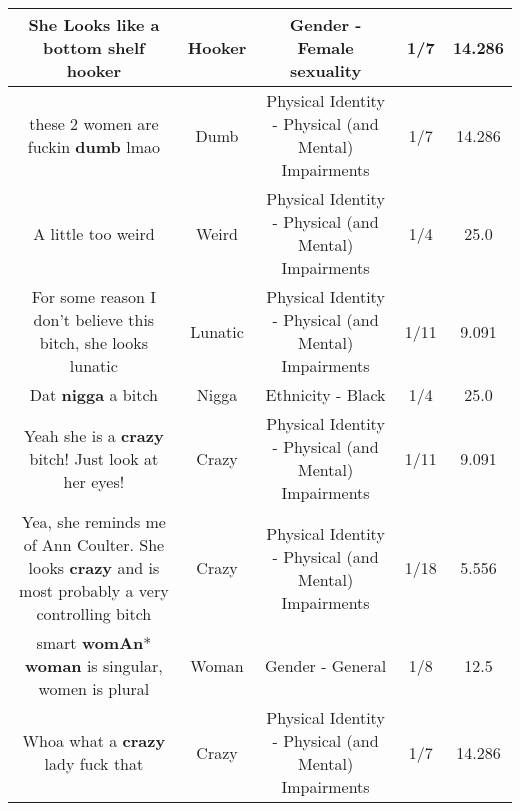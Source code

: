 \documentclass[11pt]{article}
\newlength\mylength
\begin{document}
\begin{center}
\begin{longtable}{|C{.65\mylength}|C{.30\mylength}|C{.12\mylength}|C{.12\mylength}|C{.12\mylength}|}
  \small She Looks like a bottom shelf hooker\normalsize   & Hooker & Gender - Female sexuality & 1/7 & 14.286 \\  \hline
  \small these 2 women are fuckin \textbf{dumb} lmao\normalsize   & Dumb & Physical Identity - Physical (and Mental) Impairments & 1/7 & 14.286 \\  \hline
  \small A little too weird\normalsize   & Weird & Physical Identity - Physical (and Mental) Impairments & 1/4 & 25.0 \\  \hline
  \small For some reason I don't believe this bitch, she looks lunatic\normalsize   & Lunatic & Physical Identity - Physical (and Mental) Impairments & 1/11 & 9.091 \\  \hline
  \small Dat \textbf{nigga} a bitch\normalsize   & Nigga & Ethnicity - Black & 1/4 & 25.0 \\  \hline
  \small Yeah she is a \textbf{crazy} bitch! Just look at her eyes!\normalsize   & Crazy & Physical Identity - Physical (and Mental) Impairments & 1/11 & 9.091 \\  \hline
  \small Yea, she reminds me of Ann Coulter. She looks \textbf{crazy} and is most probably a very controlling bitch\normalsize   & Crazy & Physical Identity - Physical (and Mental) Impairments & 1/18 & 5.556 \\  \hline
  \small smart \textbf{womAn}*   \textbf{woman} is singular, women is plural\normalsize   & Woman & Gender - General & 1/8 & 12.5 \\  \hline
  \small Whoa what a \textbf{crazy} lady fuck that\normalsize   & Crazy & Physical Identity - Physical (and Mental) Impairments & 1/7 & 14.286 \\  \hline

\end{longtable}
\end{center}
\end{document}

